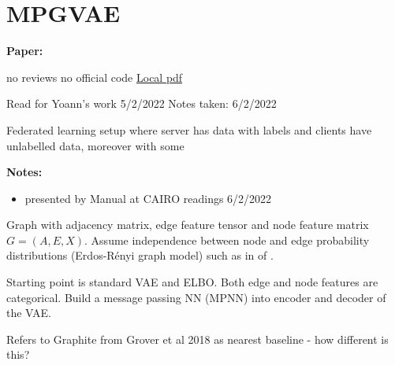 \clearpage

\section{MPGVAE}\label{sec:MPGVAE}

\begin{notebox}
\textbf{Paper: } 
\vspace{5pt}

no reviews
\hspace{1cm}
no official code
\hspace{1cm}
\href{Flam-Shepherd et al_2021_MPGVAE.pdf}{Local pdf}
\vspace{3pt}

Read for Yoann's work 5/2/2022
\hfill Notes taken: 6/2/2022 
\end{notebox}

\begin{notebox}[colback=red!5]
\tldr Federated learning setup where server has data with labels and clients have unlabelled data, moreover with some 
\end{notebox}

\begin{notebox}[colback=yellow!5]
\textbf{Notes:} 
\begin{itemize}[nosep]
\item presented by Manual at CAIRO readings 6/2/2022
\end{itemize}
\end{notebox}


Graph with adjacency matrix, edge feature tensor and node feature matrix $G = (A, E, X)$.
Assume independence between node and edge probability distributions (Erdos-R\'enyi graph model) such as in  of \textcite{simonovsky_graphvae_2018}.

Starting point is standard VAE and ELBO. Both edge and node features are categorical.
Build a message passing NN (MPNN) into encoder and decoder of the VAE.

Refers to Graphite from Grover et al 2018 as nearest baseline - how different is this?

